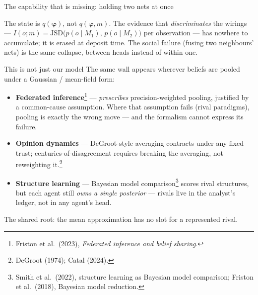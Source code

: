 \documentclass[aspectratio=169,11pt]{beamer}
\begin{document}
\begin{frame}{The capability that is missing: holding two nets at once}
\begin{center}
  \end{center}
  \vspace{0.1em}
  {\small The state is $q(\bm{\varphi})$, not $q(\bm{\varphi}, m)$. The
   evidence that \emph{discriminates} the wirings ---
   $I(o;m) = \mathrm{JSD}\big(p(o \mid M_1),\, p(o \mid M_2)\big)$ per
   observation --- has nowhere to accumulate; it is \alert{erased at deposit
   time}. The social failure (fusing two neighbours' nets) is the same
   collapse, between heads instead of within one.}
\end{frame}

\begin{frame}{This is not just our model}
  The same wall appears wherever beliefs are pooled under a Gaussian /
  mean-field form:
  \vspace{0.4em}
  \begin{itemize}
    \item \textbf{Federated inference}\footnote[frame]{\tiny Friston et al.\
      (2023), \emph{Federated inference and belief sharing}.} ---
      \emph{prescribes} precision-weighted pooling, justified by a
      common-cause assumption. Where that assumption fails (rival paradigms),
      pooling is exactly the wrong move --- and the formalism cannot express
      its failure.
    \item \textbf{Opinion dynamics} --- DeGroot-style averaging contracts
      under any fixed trust; centuries-of-disagreement requires breaking the
      averaging, not reweighting it.\footnote[frame]{\tiny DeGroot (1974);
      Catal (2024).}
    \item \textbf{Structure learning} --- Bayesian model
      comparison\footnote[frame]{\tiny Smith et al.\ (2022), structure
      learning as Bayesian model comparison; Friston et al.\ (2018), Bayesian
      model reduction.} scores rival structures, but each agent still
      \emph{owns a single posterior} --- rivals live in the analyst's ledger,
      not in any agent's head.
  \end{itemize}
  \vspace{0.4em}
  \begin{center}
    \small The shared root: the mean approximation has no slot for a
    represented rival.
  \end{center}
\end{frame}
\end{document}
